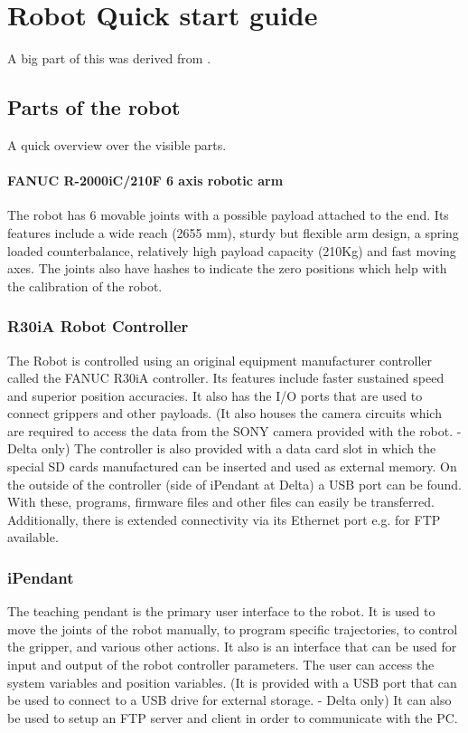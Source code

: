 \chapter{Robot Quick start guide}
A big part of this was derived from \cite{MatlabControl}.

\section{Parts of the robot}
A quick overview over the visible parts.

\subsubsection{FANUC R-2000iC/210F 6 axis robotic arm}
The robot has 6 movable joints with a possible payload attached to the end. Its features include a wide reach (2655 mm), sturdy but flexible arm design, a spring loaded counterbalance, relatively high payload capacity (210Kg) and fast moving axes. The joints also have hashes to indicate the zero positions which help with the calibration of the robot. 

\subsection{R30iA Robot Controller }
The Robot is controlled using an original equipment manufacturer controller called the FANUC R30iA controller. Its features include faster sustained speed and superior position accuracies. It also has the I/O ports that are used to connect grippers and other payloads. (It also houses the camera circuits which are required to access the data from the SONY camera provided with the robot. - Delta only)  The controller is also provided with a data card slot in which the special SD cards manufactured can be inserted and used as external memory. On the outside of the controller (side of iPendant at Delta) a USB port can be found. With these, programs, firmware files and other files can easily be transferred. Additionally, there is extended connectivity via its Ethernet port e.g. for FTP available.

\subsection{iPendant}
The teaching pendant is the primary user interface to the robot. It is used to move the joints of the robot manually, to program specific trajectories, to control the gripper, and various other actions. It also is an interface that can be used for input and output of the robot controller parameters. The user can access the system variables and position variables. (It is provided with a USB port that can be used to connect to a USB drive for external storage. - Delta only) It can also be used to setup an FTP server and client in order to communicate with the PC. 

